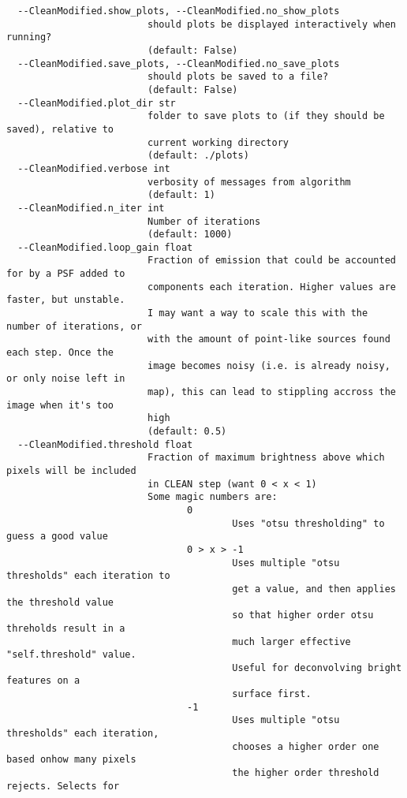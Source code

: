 \begin{verbatim}
  --CleanModified.show_plots, --CleanModified.no_show_plots
                         should plots be displayed interactively when running?
                         (default: False)
  --CleanModified.save_plots, --CleanModified.no_save_plots
                         should plots be saved to a file?
                         (default: False)
  --CleanModified.plot_dir str
                         folder to save plots to (if they should be saved), relative to
                         current working directory
                         (default: ./plots)
  --CleanModified.verbose int
                         verbosity of messages from algorithm
                         (default: 1)
  --CleanModified.n_iter int
                         Number of iterations
                         (default: 1000)
  --CleanModified.loop_gain float
                         Fraction of emission that could be accounted for by a PSF added to
                         components each iteration. Higher values are faster, but unstable.
                         I may want a way to scale this with the number of iterations, or
                         with the amount of point-like sources found each step. Once the 
                         image becomes noisy (i.e. is already noisy, or only noise left in 
                         map), this can lead to stippling accross the image when it's too 
                         high
                         (default: 0.5)
  --CleanModified.threshold float
                         Fraction of maximum brightness above which pixels will be included
                         in CLEAN step (want 0 < x < 1)
                         Some magic numbers are:
                                0
                                        Uses "otsu thresholding" to guess a good value
                                0 > x > -1
                                        Uses multiple "otsu thresholds" each iteration to
                                        get a value, and then applies the threshold value 
                                        so that higher order otsu threholds result in a 
                                        much larger effective "self.threshold" value. 
                                        Useful for deconvolving bright features on a 
                                        surface first.
                                -1
                                        Uses multiple "otsu thresholds" each iteration, 
                                        chooses a higher order one based onhow many pixels 
                                        the higher order threshold rejects. Selects for 

\end{verbatim}
